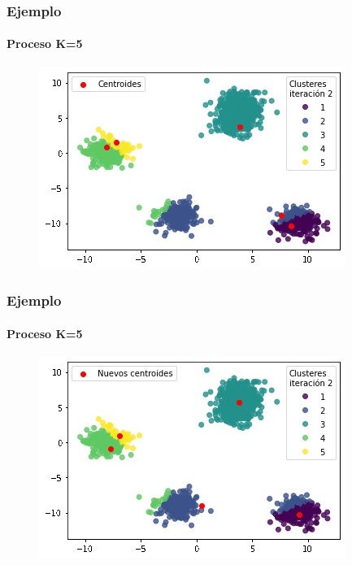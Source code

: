 \documentclass[
  shownotes,
  xcolor={svgnames},
  hyperref={colorlinks,citecolor=DarkBlue,linkcolor=DarkRed,urlcolor=DarkBlue}
  , aspectratio=169]{beamer}
\begin{document}
\begin{frame}
\frametitle{Ejemplo}
\framesubtitle{Proceso K=5}


\begin{figure}[H] \centering

    \centering
    \includegraphics[scale=.7]{figures/k5_1.jpg}
  \\
  \tiny
\end{figure}



\end{frame}
\begin{frame}
\frametitle{Ejemplo}
\framesubtitle{Proceso K=5}


\begin{figure}[H] \centering

    \centering
    \includegraphics[scale=.7]{figures/k5_2.jpg}
  \\
  \tiny
\end{figure}



\end{frame}
\end{document}
